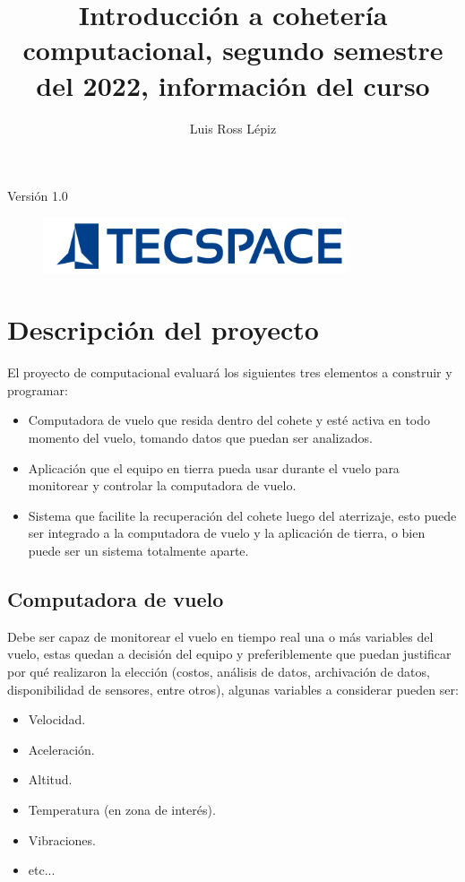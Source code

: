 ﻿\documentclass[letterpaper]{article}
\title{Introducción a cohetería computacional, segundo semestre del 2022, información del curso}
\author{Luis Ross Lépiz}
\begin{document}
\maketitle
\thispagestyle{empty}
\begin{center}
    Versión 1.0
\end{center}

\begin{figure}[b]
    \centering
    \includegraphics[width=0.8\textwidth]{img/logo.png}
\end{figure}
\clearpage

\tableofcontents
\clearpage

\section{Descripción del proyecto}
El proyecto de computacional evaluará los siguientes tres elementos a construir y programar:
\begin{itemize}
    \item Computadora de vuelo que resida dentro del cohete y esté activa en todo momento del vuelo, 
        tomando datos que puedan ser analizados.
    \item Aplicación que el equipo en tierra pueda usar durante el vuelo para monitorear y controlar la computadora de vuelo.
    \item Sistema que facilite la recuperación del cohete luego del aterrizaje, esto puede ser 
        integrado a la computadora de vuelo y la aplicación de tierra, o bien puede ser un sistema totalmente aparte.
\end{itemize}

\subsection{Computadora de vuelo}
Debe ser capaz de monitorear el vuelo en tiempo real una o más variables del vuelo, estas quedan a 
decisión del equipo y preferiblemente que puedan justificar por qué realizaron la elección (costos, 
análisis de datos, archivación de datos, disponibilidad de sensores, entre otros), algunas variables 
a considerar pueden ser:
\begin{itemize}
    \item Velocidad.
    \item Aceleración.
    \item Altitud.
    \item Temperatura (en zona de interés).
    \item Vibraciones.
    \item etc...
\end{itemize}
\end{document}
